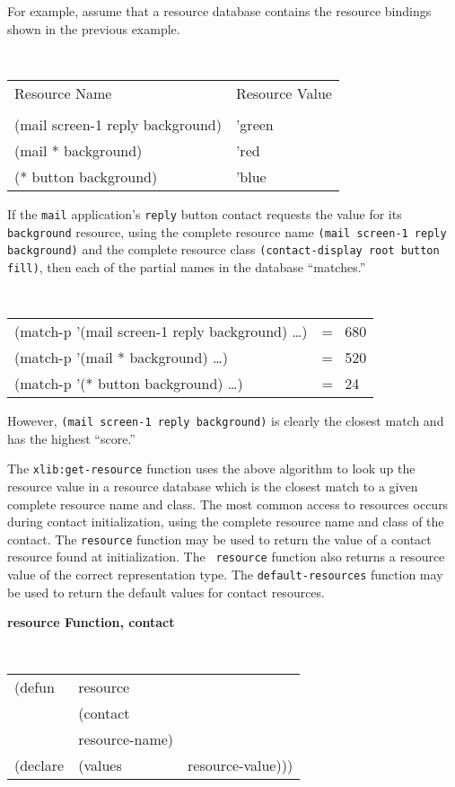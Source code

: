 For example, assume that a resource database contains the 
resource bindings shown in the previous example.

\begin{center}
\tt
\begin{tabular}{ll}
{\rm Resource Name} & {\rm Resource Value}\\
\\
(mail screen-1 reply background) & 'green\\
(mail * background)       & 'red\\
(* button background)     & 'blue
\end{tabular}
\rm
\end{center}

If the {\tt mail} application's {\tt reply} button contact requests the
value for its {\tt background} resource, using the complete resource
name {\tt (mail screen-1 reply background)} and the complete resource
class  {\tt (contact-display root button fill)}, then
each of the partial names in the database ``matches.''

\begin{center}
\tt
\begin{tabular}{ll}
(match-p '(mail screen-1 reply background) \ldots) & = \ 680\\
(match-p '(mail * background) \ldots)       & = \ 520\\
(match-p '(* button background) \ldots)     & = \ 24
\end{tabular}
\rm
\end{center}

However, {\tt (mail screen-1 reply background)} is clearly the closest match and
has the highest ``score.''

The {\tt xlib:get-resource} function uses the above algorithm to look up the
resource value in a resource database which is the closest match to a given
complete resource name and class.
The most common access to resources occurs during contact initialization, using
the complete resource name and class of the contact. The {\tt resource} function
may be used to return the value of a contact resource found at  initialization. The {\tt
resource} function also returns a resource value of the correct
representation type. The {\tt default-resources} function may be used to return
the default values for contact resources.

{\samepage
{\large {\bf resource \hfill Function, contact}}
\begin{flushright} \parbox[t]{6.125in}{
\tt
\begin{tabular}{lll}
\raggedright
(defun & resource & \\
& (contact\\
& resource-name) \\
(declare &(values &resource-value)))
\end{tabular}
\rm

}\end{flushright}}

